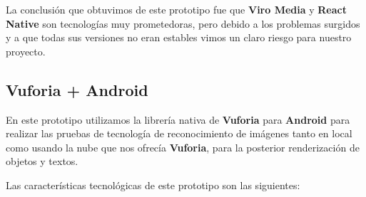 \begin{flushleft}
La conclusión que obtuvimos de este prototipo fue que \textbf{Viro Media} y \textbf{React Native} son tecnologías muy prometedoras, pero debido a los
 problemas surgidos y a que todas sus versiones no eran estables vimos un claro riesgo para
 nuestro proyecto.
\end{flushleft}

\newpage
\subsection{Vuforia + Android} 
\label{makereference3.6.3} 
 
\begin{flushleft}
En este prototipo utilizamos la librería nativa de \textbf{Vuforia} para \textbf{Android} para 
realizar las pruebas de tecnología de reconocimiento de imágenes tanto en  
local como usando la nube que nos ofrecía \textbf{Vuforia}, para la posterior renderización
de objetos y textos.

Las características tecnológicas de este prototipo son las siguientes:
\end{flushleft}

